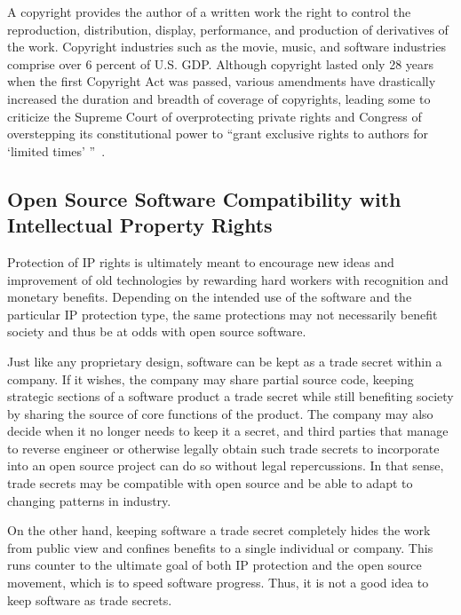 \documentclass[12pt,letterpaper]{article}
\begin{document}
A copyright provides the author of a written work the right to control the
reproduction, distribution, display, performance, and production of derivatives
of the work. Copyright industries such as the movie, music, and software
industries comprise over 6 percent of U.S. GDP. Although copyright lasted only
28 years when the first Copyright Act was passed, various amendments have
drastically increased the duration and breadth of coverage of copyrights,
leading some to criticize the Supreme Court of overprotecting private rights
and Congress of overstepping its constitutional power to ``grant exclusive
rights to authors for `limited times' ''~\citep[p. 172]{quinn2015}.


\subsection*{Open Source Software Compatibility with Intellectual Property Rights}


Protection of IP rights is ultimately meant to encourage new ideas and
improvement of old technologies by rewarding hard workers with recognition and
monetary benefits. Depending on the intended use of the software and the
particular IP protection type, the same protections may not necessarily benefit
society and thus be at odds with open source software.

Just like any proprietary design, software can be kept as a trade secret within
a company. If it wishes, the company may share partial source code, keeping
strategic sections of a software product a trade secret while still benefiting
society by sharing the source of core functions of the product. The company may
also decide when it no longer needs to keep it a secret, and third parties that
manage to reverse engineer or otherwise legally obtain such trade secrets to
incorporate into an open source project can do so without legal repercussions.
In that sense, trade secrets may be compatible with open source and be able to
adapt to changing patterns in industry.

On the other hand, keeping software a trade secret completely hides the work
from public view and confines benefits to a single individual or company. This
runs counter to the ultimate goal of both IP protection and the open source
movement, which is to speed software progress. Thus, it is not a good idea to
keep software as trade secrets.
\end{document}
